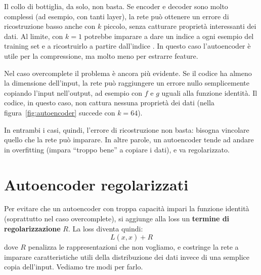 Il collo di bottiglia, da solo, non basta. Se encoder e decoder sono molto complessi (ad esempio, con tanti layer), la rete può ottenere un errore di ricostruzione basso anche con $k$ piccolo, senza catturare proprietà interessanti dei dati. Al limite, con $k = 1$ potrebbe imparare a dare un indice a ogni esempio del training set e a ricostruirlo a partire dall'indice \cite{Goodfellow-et-al-2016}. In questo caso l'autoencoder è utile per la compressione, ma molto meno per estrarre feature.

Nel caso overcomplete il problema è ancora più evidente. Se il codice ha almeno la dimensione dell'input, la rete può raggiungere un errore nullo semplicemente copiando l'input nell'output, ad esempio con $f$ e $g$ uguali alla funzione identità. Il codice, in questo caso, non cattura nessuna proprietà dei dati (nella figura~\ref{fig:autoencoder} succede con $k = 64$).

In entrambi i casi, quindi, l'errore di ricostruzione non basta: bisogna vincolare quello che la rete può imparare. In altre parole, un autoencoder tende ad andare in overfitting (impara ``troppo bene'' a copiare i dati), e va regolarizzato.

\section{Autoencoder regolarizzati}\label{sec:autoencoder-regolarizzati}
Per evitare che un autoencoder con troppa capacità impari la funzione identità (soprattutto nel caso overcomplete), si aggiunge alla loss un \textbf{termine di regolarizzazione} $R$. La loss diventa quindi:
\[
    L(x, \hat{x}) + R
\]
dove $R$ penalizza le rappresentazioni che non vogliamo, e costringe la rete a imparare caratteristiche utili della distribuzione dei dati invece di una semplice copia dell'input. Vediamo tre modi per farlo.


